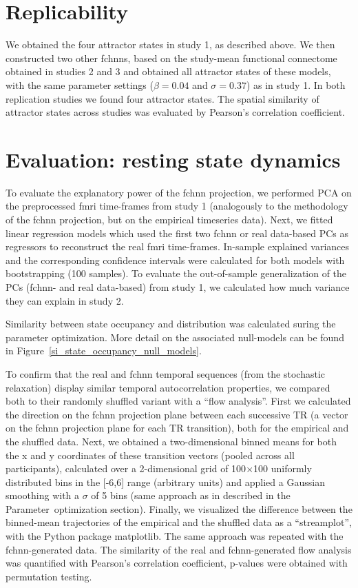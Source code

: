 \documentclass{article}
\begin{document}
\section{Replicability}

We obtained the four attractor states in study 1, as described above. We then constructed two other \acrshort{fchnn}s, based on the study-mean functional connectome obtained in studies 2 and 3 and  obtained all attractor states of these models, with the same parameter settings ($\beta = 0.04$ and $\sigma = 0.37$) as in study 1. In both replication studies we found four attractor states. The spatial similarity of attractor states across studies was evaluated by Pearson's correlation coefficient.

\section{Evaluation: resting state dynamics}

To evaluate the explanatory power of the \acrshort{fchnn} projection, we performed PCA on the preprocessed \acrshort{fmri} time-frames from study 1 (analogously to the methodology of the \acrshort{fchnn} projection, but on the empirical timeseries data).
Next, we fitted linear regression models which used the first two \acrshort{fchnn} or real data-based PCs as regressors to reconstruct the real \acrshort{fmri} time-frames. In-sample explained variances and the corresponding confidence intervals were calculated for both models with bootstrapping (100 samples). To evaluate the out-of-sample generalization of the PCs (\acrshort{fchnn}- and real data-based) from study 1, we calculated how much variance they can explain in study 2.

Similarity between state occupancy and distribution was calculated suring the parameter optimization. More detail on the associated null-models can be found in Figure~\ref{si_state_occupancy_null_models}.

To confirm that the real and \acrshort{fchnn} temporal sequences (from the stochastic relaxation) display similar temporal autocorrelation properties, we compared both to their randomly shuffled variant with a ``flow analysis''.
First we calculated the direction on the \acrshort{fchnn} projection plane between each successive TR (a vector on the \acrshort{fchnn} projection plane for each TR transition), both for the empirical and the shuffled data.
Next, we obtained a two-dimensional binned means for both the x and y coordinates of these transition vectors (pooled across all participants), calculated over a 2-dimensional grid of 100$\times$100 uniformly distributed bins in the [-6,6] range (arbitrary units) and applied a Gaussian smoothing with a $\sigma$ of 5 bins (same approach as in described in the Parameter~optimization section).
Finally, we visualized the difference between the binned-mean trajectories of the empirical and the shuffled data as a ``streamplot'', with the Python package matplotlib.
The same approach was repeated with the \acrshort{fchnn}-generated data. The similarity of the real and \acrshort{fchnn}-generated flow analysis was quantified with Pearson's correlation coefficient, p-values were obtained with permutation testing.
\end{document}
